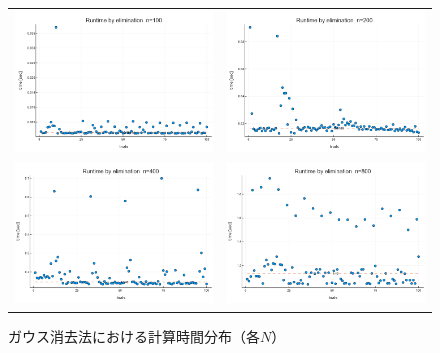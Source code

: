 \documentclass[a4paper,11pt]{ltjsarticle}
\begin{document}
    \begin{figure}[H]
    \centering
    \begin{tabular}{cc}
    \includegraphics[width=72mm]{graphs/exp1_n100_time.png} &
    \includegraphics[width=72mm]{graphs/exp1_n200_time.png} \\
    \includegraphics[width=72mm]{graphs/exp1_n400_time.png} &
    \includegraphics[width=72mm]{graphs/exp1_n800_time.png} \\
  \end{tabular}
  \caption{ガウス消去法における計算時間分布（各$N$）}
  \label{fig:exp1_times}
\end{figure}
\end{document}

